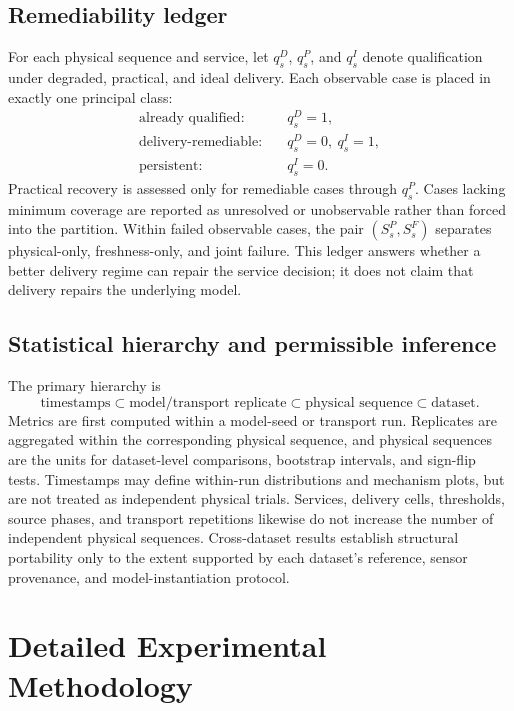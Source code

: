 \documentclass[journal,onecolumn]{IEEEtran}
\begin{document}
\subsection{Remediability ledger}
For each physical sequence and service, let $q_s^{D}$, $q_s^{P}$, and $q_s^{I}$ denote qualification under degraded, practical, and ideal delivery. Each observable case is placed in exactly one principal class:
\begin{align}
\text{already qualified}:&\quad q_s^{D}=1,\\
\text{delivery-remediable}:&\quad q_s^{D}=0,\ q_s^{I}=1,\\
\text{persistent}:&\quad q_s^{I}=0.
\end{align}
Practical recovery is assessed only for remediable cases through $q_s^{P}$. Cases lacking minimum coverage are reported as unresolved or unobservable rather than forced into the partition. Within failed observable cases, the pair $(S_s^P,S_s^F)$ separates physical-only, freshness-only, and joint failure. This ledger answers whether a better delivery regime can repair the service decision; it does not claim that delivery repairs the underlying model.

\subsection{Statistical hierarchy and permissible inference}
The primary hierarchy is
\begin{equation}
\text{timestamps}
\subset
\text{model/transport replicate}
\subset
\text{physical sequence}
\subset
\text{dataset}.
\end{equation}
Metrics are first computed within a model-seed or transport run. Replicates are aggregated within the corresponding physical sequence, and physical sequences are the units for dataset-level comparisons, bootstrap intervals, and sign-flip tests. Timestamps may define within-run distributions and mechanism plots, but are not treated as independent physical trials. Services, delivery cells, thresholds, source phases, and transport repetitions likewise do not increase the number of independent physical sequences. Cross-dataset results establish structural portability only to the extent supported by each dataset's reference, sensor provenance, and model-instantiation protocol.

\section{Detailed Experimental Methodology}
\end{document}
